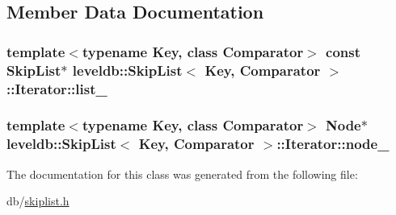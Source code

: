 \subsection{Member Data Documentation}
\hypertarget{classleveldb_1_1_skip_list_1_1_iterator_a975880d27195f53ff0d0e599543b4aba}{}
\subsubsection[{list\+\_\+}]{\setlength{\rightskip}{0pt plus 5cm}template$<$typename Key, class Comparator$>$ const {\bf Skip\+List}$\ast$ {\bf leveldb\+::\+Skip\+List}$<$ {\bf Key}, {\bf Comparator} $>$\+::Iterator\+::list\+\_\+\hspace{0.3cm}{\ttfamily [private]}}\label{classleveldb_1_1_skip_list_1_1_iterator_a975880d27195f53ff0d0e599543b4aba}
\hypertarget{classleveldb_1_1_skip_list_1_1_iterator_aca4dad33d2cb4c9ea3a16f2d5f164a42}{}
\subsubsection[{node\+\_\+}]{\setlength{\rightskip}{0pt plus 5cm}template$<$typename Key, class Comparator$>$ {\bf Node}$\ast$ {\bf leveldb\+::\+Skip\+List}$<$ {\bf Key}, {\bf Comparator} $>$\+::Iterator\+::node\+\_\+\hspace{0.3cm}{\ttfamily [private]}}\label{classleveldb_1_1_skip_list_1_1_iterator_aca4dad33d2cb4c9ea3a16f2d5f164a42}


The documentation for this class was generated from the following file\+:\begin{DoxyCompactItemize}
\item 
db/\hyperlink{skiplist_8h}{skiplist.\+h}\end{DoxyCompactItemize}
